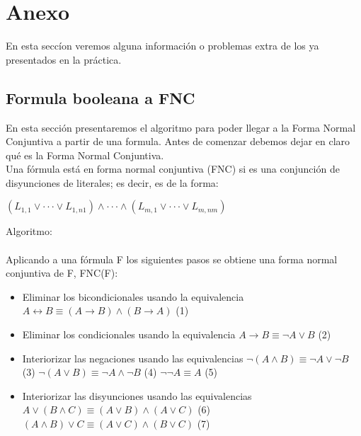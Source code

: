 \documentclass[12pt,twoside]{article}
\begin{document}
\newpage
\section{Anexo}
En  esta  seccíon  veremos  alguna información o problemas extra de los ya presentados en la práctica.

\subsection{Formula booleana a FNC}
En esta sección presentaremos el algoritmo para poder llegar a la Forma Normal Conjuntiva a partir de una formula.
Antes de comenzar debemos dejar en claro qué es la Forma Normal Conjuntiva. \\
Una fórmula está en forma normal conjuntiva (FNC) si es una conjunción de disyunciones de literales; es decir, es de la forma: \\
\begin{center}
$(L_{1,1} \vee \cdot \cdot \cdot \vee L_{1,n1}) \wedge \cdot \cdot \cdot  \wedge (L_{m,1} \vee \cdot \cdot \cdot \vee L_{m,nm})$
\end{center}
Algoritmo: \\\\
Aplicando a una fórmula F los siguientes pasos se obtiene una forma normal conjuntiva de F, FNC(F):
\begin{itemize}
    \item[1.] Eliminar los bicondicionales usando la equivalencia \newline
		$A \leftrightarrow B \equiv (A \rightarrow B) \wedge (B \rightarrow A)$ \hspace{80}   (1)
	\item[2.] Eliminar los condicionales usando la equivalencia \newline
		$A \rightarrow B \equiv \neg A \vee B$ \hspace{145}   (2)
	\item[3.] Interiorizar las negaciones usando las equivalencias \newline
		$\neg(A \wedge B) \equiv \neg A \vee \neg B$ \hspace{125}   (3)  \newline
		$\neg(A \vee B) \equiv \neg A \wedge \neg B$ \hspace{125}   (4)  \newline
		$\neg\neg A \equiv A$ \hspace{188}   (5)
	\item[4.] Interiorizar las disyunciones usando las equivalencias \newline
		$A \vee (B \wedge C) \equiv (A \vee B) \wedge (A \vee C)$ \hspace{65}   (6) \\
		$(A \wedge B) \vee C \equiv (A \vee C) \wedge (B \vee C)$ \hspace{65}   (7)
\end{itemize}
\end{document}
